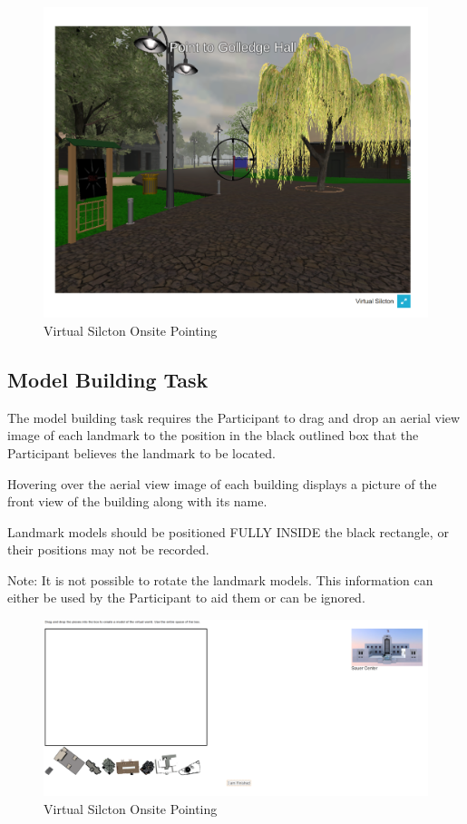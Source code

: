 \documentclass[
  12pt,
]{book}
\begin{document}
\begin{figure}
\centering
\includegraphics{./figs/Onsite_Pointing.png}
\caption{Virtual Silcton Onsite Pointing}
\end{figure}

\hypertarget{model-building-task}{%
\subsection{Model Building Task}\label{model-building-task}}

The model building task requires the Participant to drag and drop an aerial view image of each landmark to the position in the black outlined box that the Participant believes the landmark to be located.

Hovering over the aerial view image of each building displays a picture of the front view of the building along with its name.

Landmark models should be positioned FULLY INSIDE the black rectangle, or their positions may not be recorded.

Note: It is not possible to rotate the landmark models. This information can either be used by the Participant to aid them or can be ignored.

\begin{figure}
\centering
\includegraphics{./figs/Model_Building.png}
\caption{Virtual Silcton Onsite Pointing}
\end{figure}
\end{document}
